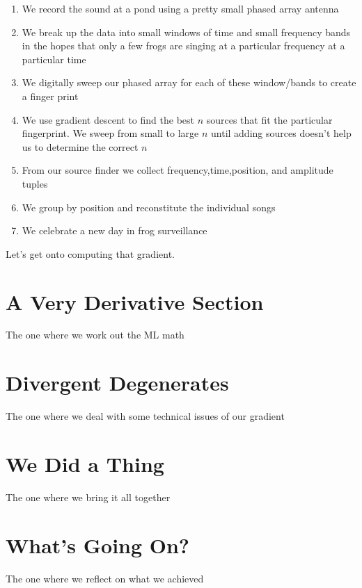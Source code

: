 \documentclass[10pt,a4paper]{article}
\begin{document}
\begin{enumerate}
\item We record the sound at a pond using a pretty small phased array antenna
\item We break up the data into small windows of time and small frequency bands in the hopes that only a few frogs are singing at a particular frequency at a particular time
\item We digitally sweep our phased array for each of these window/bands to create a finger print
\item We use gradient descent to find the best $n$ sources that fit the particular fingerprint. We sweep from small to large $n$ until adding sources doesn't help us to determine the correct $n$
\item From our source finder we collect frequency,time,position, and amplitude tuples
\item We group by position and reconstitute the individual songs
\item We celebrate a new day in frog surveillance 
\end{enumerate}

Let's get onto computing that gradient.

\newpage
\section{A Very Derivative Section}
The one where we work out the ML math
\section{Divergent Degenerates}
The one where we deal with some technical issues of our gradient
\section{We Did a Thing}
The one where we bring it all together
\section{What's Going On?}
The one where we reflect on what we achieved
\newpage


\end{document}
